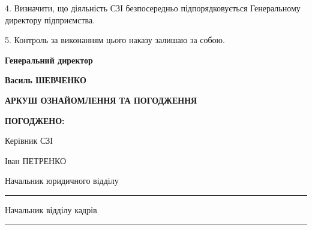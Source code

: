 \documentclass[12pt]{article}
\begin{document}
4. Визначити, що діяльність СЗІ безпосередньо підпорядковується Генеральному директору підприємства.

5. Контроль за виконанням цього наказу залишаю за собою.

\vspace{1.5cm}

\noindent
\parbox[t]{0.5\textwidth}{\bfseries Генеральний директор}%
\parbox[t]{0.5\textwidth}{\raggedleft{}\bfseries Василь ШЕВЧЕНКО}

\newpage

\begin{center}
  \textbf{АРКУШ ОЗНАЙОМЛЕННЯ ТА ПОГОДЖЕННЯ}
\end{center}

\vspace{0.8cm}

\noindent
\textbf{ПОГОДЖЕНО:}

\vspace{0.5cm}
\noindent
\parbox[t]{0.5\textwidth}{Керівник СЗІ}%
\parbox[t]{0.5\textwidth}{\raggedleft{} Іван ПЕТРЕНКО}

\vspace{0.8cm}
\noindent
\parbox[t]{0.5\textwidth}{Начальник юридичного відділу}%
\parbox[t]{0.5\textwidth}{\raggedleft{} \rule{4cm}{0.5pt}}

\vspace{0.8cm}
\noindent
\parbox[t]{0.5\textwidth}{Начальник відділу кадрів}%
\parbox[t]{0.5\textwidth}{\raggedleft{} \rule{4cm}{0.5pt}}
\end{document}
